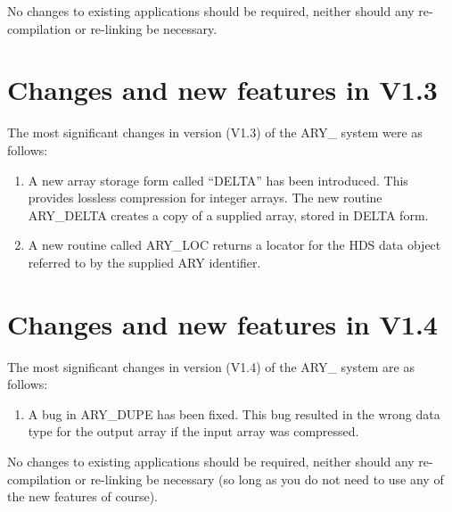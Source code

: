 \documentclass[twoside,11pt]{article}
\newcommand{\xlabel}[1]{}
\begin{document}
No changes to existing applications should be required, neither should any
re-compilation or re-linking be necessary.

\section{\xlabel{changes_and_new_features_in_v13}%
Changes and new features in V1.3}
\label{changes_and_new_features_in_v13}
The most significant changes in version (V1.3) of the ARY\_ system were
as follows:

\begin{enumerate}

\item A new array storage form called ``DELTA'' has been introduced. This
provides lossless compression for integer arrays. The new routine
ARY\_DELTA creates a copy of a supplied array, stored in DELTA form.

\item A new routine called ARY\_LOC returns a locator for the
HDS data object referred to by the supplied ARY identifier.

\end{enumerate}

\section{\xlabel{changes_and_new_features_in_v14}%
Changes and new features in V1.4}
\label{changes_and_new_features_in_v14}
The most significant changes in version (V1.4) of the ARY\_ system are
as follows:

\begin{enumerate}

\item A bug in ARY\_DUPE has been fixed. This bug resulted in the wrong data
type for the output array if the input array was compressed.

\end{enumerate}

No changes to existing applications should be required, neither should any
re-compilation or re-linking be necessary (so long as you do not need to
use any of the new features of course).

\end{document}
